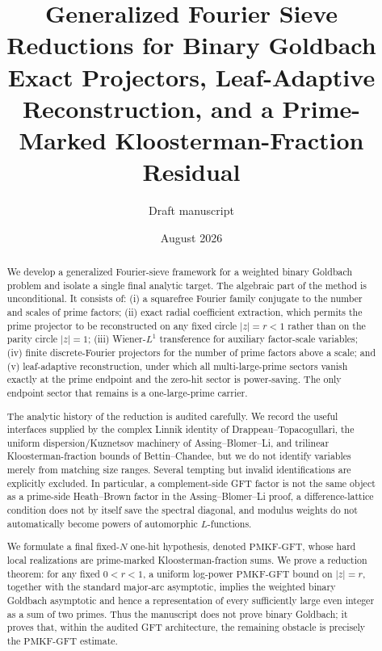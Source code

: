\documentclass[11pt]{article}
\title{\textbf{Generalized Fourier Sieve Reductions for Binary Goldbach}\\
\large Exact Projectors, Leaf-Adaptive Reconstruction, and a Prime-Marked Kloosterman-Fraction Residual}
\author{Draft manuscript}
\date{August 2026}
\theoremstyle{definition}
\theoremstyle{remark}
\newcommand{\1}{\mathbf 1}
\newcommand{\PMKF}{\mathrm{PMKF}\text{-}\mathrm{GFT}}
\begin{document}
\maketitle

\begin{abstract}
We develop a generalized Fourier-sieve framework for a weighted binary Goldbach problem and isolate a single final analytic target.  The algebraic part of the method is unconditional.  It consists of: (i) a squarefree Fourier family conjugate to the number and scales of prime factors; (ii) exact radial coefficient extraction, which permits the prime projector to be reconstructed on any fixed circle $|z|=r<1$ rather than on the parity circle $|z|=1$; (iii) Wiener-$L^1$ transference for auxiliary factor-scale variables; (iv) finite discrete-Fourier projectors for the number of prime factors above a scale; and (v) leaf-adaptive reconstruction, under which all multi-large-prime sectors vanish exactly at the prime endpoint and the zero-hit sector is power-saving.  The only endpoint sector that remains is a one-large-prime carrier.

The analytic history of the reduction is audited carefully.  We record the useful interfaces supplied by the complex Linnik identity of Drappeau--Topacogullari, the uniform dispersion/Kuznetsov machinery of Assing--Blomer--Li, and trilinear Kloosterman-fraction bounds of Bettin--Chandee, but we do not identify variables merely from matching size ranges.  Several tempting but invalid identifications are explicitly excluded.  In particular, a complement-side GFT factor is not the same object as a prime-side Heath--Brown factor in the Assing--Blomer--Li proof, a difference-lattice condition does not by itself save the spectral diagonal, and modulus weights do not automatically become powers of automorphic $L$-functions.

We formulate a final fixed-$N$ one-hit hypothesis, denoted $\PMKF$, whose hard local realizations are prime-marked Kloosterman-fraction sums.  We prove a reduction theorem: for any fixed $0<r<1$, a uniform log-power $\PMKF$ bound on $|z|=r$, together with the standard major-arc asymptotic, implies the weighted binary Goldbach asymptotic and hence a representation of every sufficiently large even integer as a sum of two primes.  Thus the manuscript does not prove binary Goldbach; it proves that, within the audited GFT architecture, the remaining obstacle is precisely the $\PMKF$ estimate.
\end{abstract}
\end{document}
